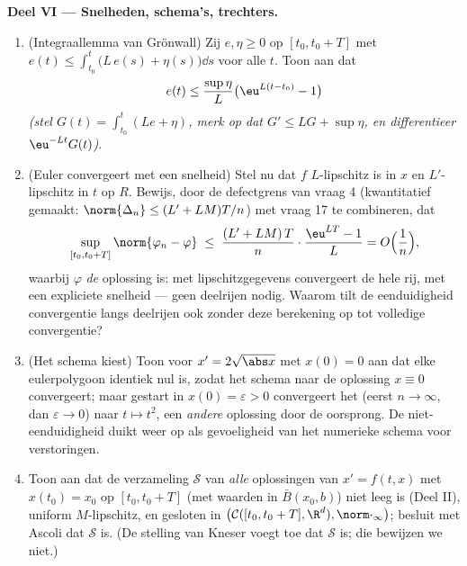 \begin{problem}[{Weekendopgave --- bestaan van oplossingen van $x'
= f(t, x)$ zonder Lipschitz}]
\medskip
\noindent\textbf{Deel VI --- Snelheden, schema's, trechters.}
\begin{enumerate}[resume]
  \item (Integraallemma van Grönwall) Zij $e, \eta \geq 0$ 
        op $[t_0, t_0+T]$ met $e(t) \leq \int_{t_0}
        ^t\bigl(L\,e(s) + \eta(s)\bigr)\dd s$ voor alle $t$. Toon
        aan dat
        \[
        e(t) \leq \frac{\sup\eta}{L}\bigl(\eu^{L(t - t_0)} -
        1\bigr)
        \]
        \emph{(stel $G(t) = \int_{t_0}^t(Le + \eta)$, merk op dat
        $G' \leq LG + \sup\eta$, en differentieer
        $\eu^{-Lt}G(t)$)}.
  \item (Euler convergeert met een snelheid) Stel nu dat $f$
        $L$-lipschitz is in $x$ en $L'$-lipschitz in $t$ op $R$.
        Bewijs, door de defectgrens van vraag 4 (kwantitatief
        gemaakt: $\norm{\Delta_n} \leq (L' + LM)T/n$) met vraag 17
        te combineren, dat
        \[
        \sup_{[t_0, t_0+T]}\norm{\varphi_n - \varphi}
        \;\leq\; \frac{(L' + LM)\,T}{n}\cdot
        \frac{\eu^{LT} - 1}{L} = O\Bigl(\frac1n\Bigr),
        \]
        waarbij $\varphi$ \emph{de} oplossing is: met
        lipschitzgegevens convergeert de hele rij, met een
        expliciete snelheid --- geen deelrijen nodig. Waarom tilt
        de eenduidigheid convergentie langs deelrijen ook zonder
        deze berekening op tot volledige convergentie?
  \item (Het schema kiest) Toon voor $x' = 2\sqrt{\abs x}$ met
        $x(0) = 0$ aan dat elke eulerpolygoon identiek nul is,
        zodat het schema naar de oplossing $x \equiv 0$
        convergeert; maar gestart in $x(0) = \varepsilon > 0$
        convergeert het (eerst $n \to \infty$, dan $\varepsilon
        \to 0$) naar $t \mapsto t^2$, een \emph{andere} oplossing
        door de oorsprong. De niet-eenduidigheid duikt weer op als
        gevoeligheid van het numerieke schema voor verstoringen.
  \item Toon aan dat de verzameling $\mathcal S$ van \emph{alle}
        oplossingen van $x' = f(t,x)$ met $x(t_0) = x_0$ op $[t_0,
        t_0+T]$ (met waarden in $\bar B(x_0, b)$) niet leeg is
        (Deel II), uniform $M$-lipschitz, en gesloten in
        $\bigl(\mathcal C([t_0, t_0+T], \R^d),
        \norm\cdot_\infty\bigr)$; besluit met Ascoli dat $\mathcal
        S$ \emph{} is. (De stelling van Kneser voegt toe
        dat $\mathcal S$  is; die bewijzen we niet.)

\end{enumerate}
\end{problem}
